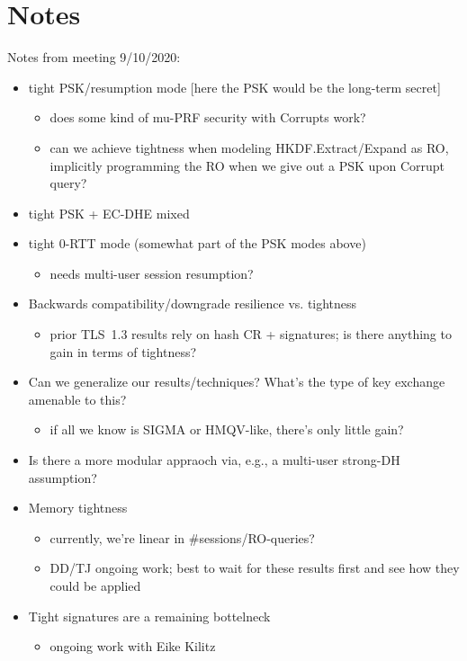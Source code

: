 \section{Notes}

Notes from meeting 9/10/2020: 
\begin{itemize}
\item tight PSK/resumption mode  [here the PSK would be the long-term secret]
\begin{itemize}
\item does some kind of mu-PRF security with Corrupts work?
\item can we achieve tightness when modeling HKDF.Extract/Expand as RO,
implicitly programming the RO when we give out a PSK upon Corrupt query?
\end{itemize}
\item tight PSK + EC-DHE mixed

\item tight 0-RTT mode  (somewhat part of the PSK modes above)
\begin{itemize}
\item needs multi-user session resumption?

\end{itemize}
\item Backwards compatibility/downgrade resilience vs. tightness
\begin{itemize}
	\item prior TLS~1.3 results rely on hash CR + signatures; is there
anything to gain in terms of tightness?
\end{itemize}

\item Can we generalize our results/techniques? What's the type of key
exchange amenable to this?
\begin{itemize}
	\item  if all we know is SIGMA or HMQV-like, there's only little gain?
\end{itemize}

\item Is there a more modular appraoch via, e.g., a multi-user strong-DH
assumption?

\item Memory tightness
\begin{itemize}
	\item currently, we're linear in \#sessions/RO-queries?
\item DD/TJ ongoing work; best to wait for these
results first and see how they could be applied
\end{itemize} 
\item Tight signatures are a remaining bottelneck
\begin{itemize}
	\item  ongoing work with Eike Kilitz
\end{itemize}


\end{itemize}
